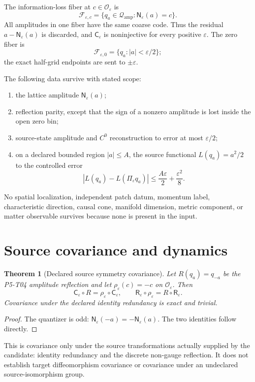 \documentclass[11pt]{article}
\newcommand{\Qamp}{\mathcal Q_{\mathrm{amp}}}
\newcommand{\Oeps}{\mathcal O_\varepsilon}
\newcommand{\Ceps}{\mathsf C_\varepsilon}
\newcommand{\Reps}{\mathsf R_\varepsilon}
\newcommand{\Neps}{\mathsf N_\varepsilon}
\newtheorem{theorem}{Theorem}
\begin{document}
The information-loss fiber at \(c\in\Oeps\) is
\[
 \mathcal F_{\varepsilon,c}
 =\{q_a\in\Qamp:\Neps(a)=c\}.
\]
All amplitudes in one fiber have the same coarse code.  Thus the residual
\(a-\Neps(a)\) is discarded, and \(\Ceps\) is noninjective for every positive
\(\varepsilon\).  The zero fiber is
\[
 \mathcal F_{\varepsilon,0}
 =\{q_a:|a|<\varepsilon/2\};
\]
the exact half-grid endpoints are sent to \(\pm\varepsilon\).

The following data survive with stated scope:
\begin{enumerate}
 \item the lattice amplitude \(\Neps(a)\);
 \item reflection parity, except that the sign of a nonzero amplitude is lost
 inside the open zero bin;
 \item source-state amplitude and \(C^0\) reconstruction to error at most
 \(\varepsilon/2\);
 \item on a declared bounded region \(|a|\leq A\), the source functional
 \(L(q_a)=a^2/2\) to the controlled error
 \[
  |L(q_a)-L(\Pi_\varepsilon q_a)|
  \leq \frac{A\varepsilon}{2}+\frac{\varepsilon^2}{8}.
  \label{eq:quadratic-error}
 \]
\end{enumerate}
No spatial localization, independent patch datum, momentum label,
characteristic direction, causal cone, manifold dimension, metric component,
or matter observable survives because none is present in the input.

\section{Source covariance and dynamics}

\begin{theorem}[Declared source symmetry covariance]
\label{thm:covariance}
Let \(R(q_a)=q_{-a}\) be the P5-T04 amplitude reflection and let
\(\rho_\varepsilon(c)=-c\) on \(\Oeps\).  Then
\[
 \Ceps\circ R=\rho_\varepsilon\circ\Ceps,\qquad
 \Reps\circ\rho_\varepsilon=R\circ\Reps.
\]
Covariance under the declared identity redundancy is exact and trivial.
\end{theorem}

\begin{proof}
The quantizer is odd:
\(\Neps(-a)=-\Neps(a)\).  The two identities follow directly.
\end{proof}

This is covariance only under the source transformations actually supplied by
the candidate: identity redundancy and the discrete non-gauge reflection.  It
does not establish target diffeomorphism covariance or covariance under an
undeclared source-isomorphism group.
\end{document}
